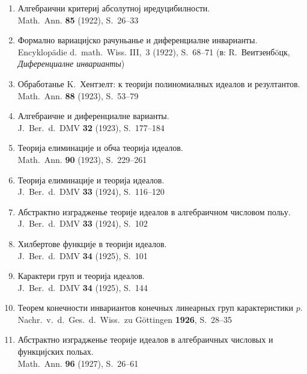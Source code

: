 \documentclass[11pt]{article}
\newcommand{\foreign}[1]{#1}
\begin{document}
\begin{enumerate}[label={\small\arabic*.},leftmargin=2em,itemsep=0.3em]
\item Алгебраични критериј абсолутној иредуцибилности.\\
\foreign{Math.\ Ann.} \textbf{85} (1922), S.~26--33

\item Формално вариацијско рачуньанье и диференциалне инварианты.\\
\foreign{Encyklopädie d.\ math.\ Wiss.} III,\ 3 (1922), S.~68--71 (в:
R.\ Веитзенбöцк, \textit{Диференциалне инварианты})

\item Обработанье K.\ Хентзелт: к теорији полиномиалных идеалов и резултантов.\\
\foreign{Math.\ Ann.} \textbf{88} (1923), S.~53--79

\item Алгебраичне и диференциалне варианты.\\
\foreign{J.\ Ber.\ d.\ DMV} \textbf{32} (1923), S.~177--184

\item Теорија елиминације и обча теорија идеалов.\\
\foreign{Math.\ Ann.} \textbf{90} (1923), S.~229--261

\item Теорија елиминације и теорија идеалов.\\
\foreign{J.\ Ber.\ d.\ DMV} \textbf{33} (1924), S.~116--120

\item Абстрактно изградженье теорије идеалов в алгебраичном числовом польу.\\
\foreign{J.\ Ber.\ d.\ DMV} \textbf{33} (1924), S.~102

\item Хилбертове функције в теорији идеалов.\\
\foreign{J.\ Ber.\ d.\ DMV} \textbf{34} (1925), S.~101

\item Карактери груп и теорија идеалов.\\
\foreign{J.\ Ber.\ d.\ DMV} \textbf{34} (1925), S.~144

\item Теорем конечности инвариантов конечных линеарных груп карактеристики $p$.\\
\foreign{Nachr.\ v.\ d.\ Ges.\ d.\ Wiss.\ zu Göttingen} \textbf{1926}, S.~28--35

\item Абстрактно изградженье теорије идеалов в алгебраичных числовых и функцијских польах.\\
\foreign{Math.\ Ann.} \textbf{96} (1927), S.~26--61


\end{enumerate}
\end{document}
